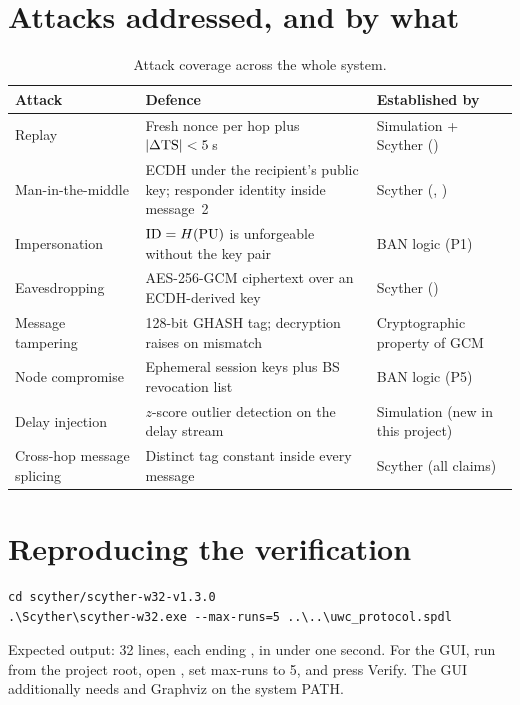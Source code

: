 \section{Attacks addressed, and by what}

\begin{table}[H]
\centering
\caption{Attack coverage across the whole system.}
\label{tab:attacks}
\small
\begin{tabularx}{\textwidth}{@{}L{34mm} X L{34mm}@{}}
\toprule
\textbf{Attack} & \textbf{Defence} & \textbf{Established by}\\
\midrule
Replay & Fresh nonce per hop plus $|\Delta \mathrm{TS}| < 5$\,s & Simulation + Scyther
  ()\\
Man-in-the-middle & ECDH under the recipient's public key; responder identity inside
  message~2 & Scyther (, )\\
Impersonation & $\mathrm{ID} = H(\mathrm{PU})$ is unforgeable without the key pair & BAN logic (P1)\\
Eavesdropping & AES-256-GCM ciphertext over an ECDH-derived key & Scyther ()\\
Message tampering & 128-bit GHASH tag; decryption raises on mismatch & Cryptographic
  property of GCM\\
Node compromise & Ephemeral session keys plus BS revocation list & BAN logic (P5)\\
Delay injection & $z$-score outlier detection on the delay stream & Simulation (new in this
  project)\\
Cross-hop message splicing & Distinct tag constant inside every message & Scyther (all
  claims)\\
\bottomrule
\end{tabularx}
\end{table}

\section{Reproducing the verification}

\begin{lstlisting}[style=plain,caption={Command-line verification.}]
cd scyther/scyther-w32-v1.3.0
.\Scyther\scyther-w32.exe --max-runs=5 ..\..\uwc_protocol.spdl
\end{lstlisting}

Expected output: 32 lines, each ending , in under one
second. For the GUI, run  from the project root, open
, set max-runs to 5, and press Verify. The GUI additionally needs
 and Graphviz on the system PATH.
